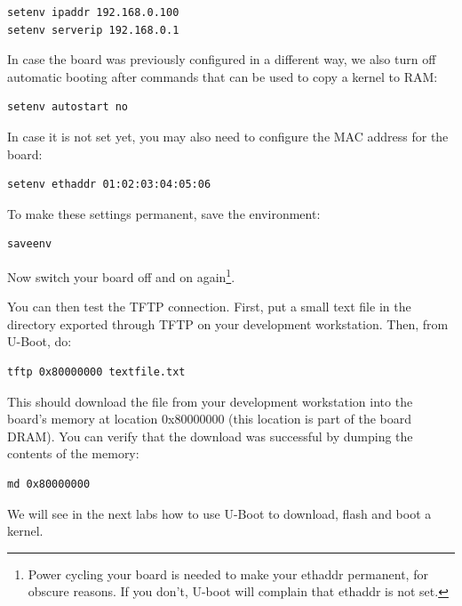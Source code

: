 \begin{verbatim}
setenv ipaddr 192.168.0.100
setenv serverip 192.168.0.1
\end{verbatim}

In case the board was previously configured in a different way, we
also turn off automatic booting after commands that can be used to
copy a kernel to RAM:

\begin{verbatim}
setenv autostart no
\end{verbatim}

In case it is not set yet, you may also need to configure the MAC address for the board:

\begin{verbatim}
setenv ethaddr 01:02:03:04:05:06
\end{verbatim}

To make these settings permanent, save the environment:

\begin{verbatim}
saveenv
\end{verbatim}

Now switch your board off and on again\footnote{Power cycling your
  board is needed to make your ethaddr permanent, for obscure
  reasons. If you don't, U-boot will complain that ethaddr is not
  set.}.

You can then test the TFTP connection. First, put a small text file in
the directory exported through TFTP on your development
workstation. Then, from U-Boot, do:

\begin{verbatim}
tftp 0x80000000 textfile.txt
\end{verbatim}

This should download the file  from your development
workstation into the board's memory at location 0x80000000 (this
location is part of the board DRAM). You can verify that the download
was successful by dumping the contents of the memory:

\begin{verbatim}
md 0x80000000
\end{verbatim}

We will see in the next labs how to use U-Boot to download, flash and
boot a kernel.
